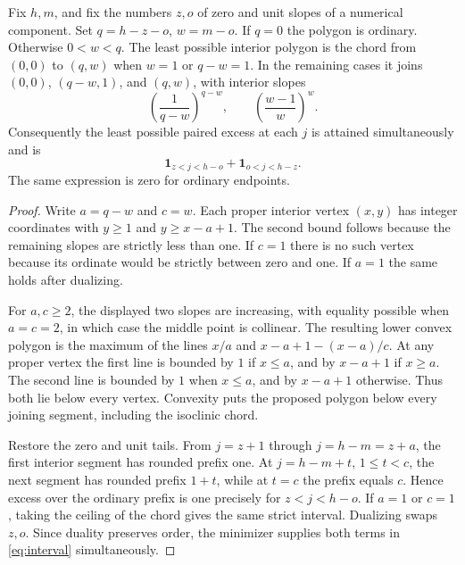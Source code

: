 \begin{theorem}\label{thm:extremal}
Fix \(h,m\), and fix the numbers \(z,o\) of zero and unit slopes
of a numerical component. Set \(q=h-z-o\), \(w=m-o\).
If \(q=0\) the polygon is ordinary. Otherwise \(0<w<q\).
The least possible interior polygon is the chord from \((0,0)\) to
\((q,w)\) when \(w=1\) or \(q-w=1\). In the remaining cases it
joins \((0,0)\), \((q-w,1)\), and \((q,w)\), with interior slopes
\[
 \left(\frac{1}{q-w}\right)^{q-w},\qquad
 \left(\frac{w-1}{w}\right)^w .
\]
Consequently the least possible paired excess at each \(j\)
is attained simultaneously and is
\begin{equation}\label{eq:interval}
  \mathbf 1_{z<j<h-o}+\mathbf 1_{o<j<h-z}.
\end{equation}
The same expression is zero for ordinary endpoints.
\end{theorem}

\begin{proof}
Write \(a=q-w\) and \(c=w\). Each proper interior vertex
\((x,y)\) has integer coordinates with \(y\ge1\) and
\(y\ge x-a+1\). The second bound follows because the remaining
slopes are strictly less than one. If \(c=1\) there is no such
vertex because its ordinate would be strictly between zero and one.
If \(a=1\) the same holds after dualizing.

For \(a,c\ge2\), the displayed two slopes are increasing, with
equality possible when \(a=c=2\), in which case the middle point is
collinear. The resulting lower convex polygon is the maximum of
the lines \(x/a\) and \(x-a+1-(x-a)/c\).
At any proper vertex the first line is bounded by \(1\) if
\(x\le a\), and by \(x-a+1\) if \(x\ge a\).
The second line is bounded by \(1\) when \(x\le a\), and by
\(x-a+1\) otherwise. Thus both lie below every vertex. Convexity
puts the proposed polygon below every joining segment, including
the isoclinic chord.

Restore the zero and unit tails. From \(j=z+1\) through
\(j=h-m=z+a\), the first interior segment has rounded prefix one.
At \(j=h-m+t\), \(1\le t<c\), the next segment has rounded prefix
\(1+t\), while at \(t=c\) the prefix equals \(c\). Hence excess
over the ordinary prefix is one precisely for \(z<j<h-o\).
If \(a=1\) or \(c=1\), taking the ceiling of the chord gives
the same strict interval. Dualizing swaps \(z,o\). Since duality
preserves order, the minimizer supplies both terms in
\eqref{eq:interval} simultaneously.
\end{proof}

